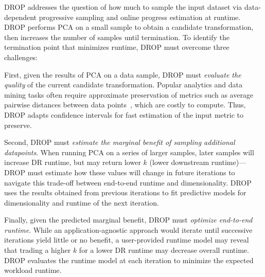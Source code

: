 DROP addresses the question of how much to sample the input dataset via data-dependent progressive sampling and online progress estimation at runtime.  
DROP performs PCA on a small sample to obtain a candidate transformation, then increases the number of samples until termination. 
To identify the termination point that minimizes runtime, DROP must overcome three challenges:

First, given the results of PCA on a data sample, DROP must \emph{evaluate the quality} of the current candidate transformation.
Popular analytics and data mining tasks often require approximate preservation of metrics such as average pairwise distances between data points~\cite{time-series-dm,dm-book}, which are costly to compute.
Thus, DROP adapts confidence intervals for fast estimation of the input metric to preserve.


Second, DROP must \emph{estimate the marginal benefit of sampling additional datapoints}.
When running PCA on a series of larger samples, later samples will increase DR runtime, but may return lower $k$ (lower downstream runtime)---DROP must estimate how these values will change in future iterations to navigate this trade-off between end-to-end runtime and dimensionality.
DROP uses the results obtained from previous iterations to fit predictive models for dimensionality and runtime of the next iteration.

Finally, given the predicted marginal benefit, DROP must \emph{optimize end-to-end runtime}.
While an application-agnostic approach would iterate until successive iterations yield little or no benefit, a user-provided runtime model may reveal that trading a higher $k$ for a lower DR runtime may decrease overall runtime.
DROP evaluates the runtime model at each iteration
to minimize the expected workload runtime.


